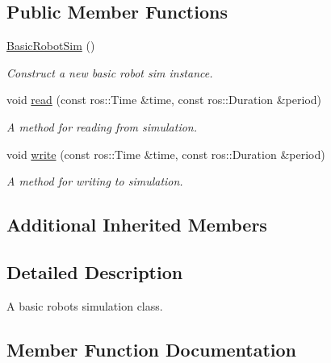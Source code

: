 \subsection*{Public Member Functions}
\begin{DoxyCompactItemize}
\item 
\mbox{\label{classBasicRobotSim_a8609903f149d0af379695b3c61fc1b9c}} 
\hyperlink{classBasicRobotSim_a8609903f149d0af379695b3c61fc1b9c}{Basic\+Robot\+Sim} ()
\begin{DoxyCompactList}\small\item\em Construct a new basic robot sim instance. \end{DoxyCompactList}\item 
void \hyperlink{classBasicRobotSim_a074eed2efbdc51b211f62ac668706237}{read} (const ros\+::\+Time \&time, const ros\+::\+Duration \&period)
\begin{DoxyCompactList}\small\item\em A method for reading from simulation. \end{DoxyCompactList}\item 
void \hyperlink{classBasicRobotSim_a0efb3d3e006cd5c233e2e273d89e06f6}{write} (const ros\+::\+Time \&time, const ros\+::\+Duration \&period)
\begin{DoxyCompactList}\small\item\em A method for writing to simulation. \end{DoxyCompactList}\end{DoxyCompactItemize}
\subsection*{Additional Inherited Members}


\subsection{Detailed Description}
A basic robot\textquotesingle{}s simulation class. 

\subsection{Member Function Documentation}
\mbox{\label{classBasicRobotSim_a074eed2efbdc51b211f62ac668706237}} 
